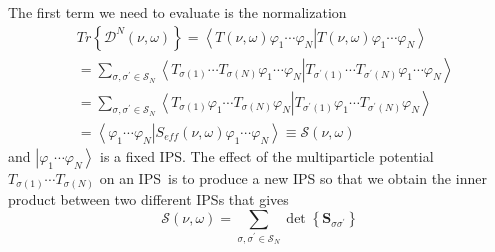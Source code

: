 \documentclass[aps,preprint]{revtex4}%
\begin{document}
The first term we need to evaluate is the normalization
\begin{align}
&  Tr\left\{  \mathcal{D}^{N}\left(  \nu,\omega\right)  \right\}
=\left\langle T\left(  \nu,\omega\right)  \varphi_{1}\cdots\varphi
_{N}\right\vert \left.  T\left(  \nu,\omega\right)  \varphi_{1}\cdots
\varphi_{N}\right\rangle \nonumber\\
&  =\sum_{\sigma,\sigma^{\prime}\in\mathcal{S}_{N}}\left\langle T_{\sigma
\left(  1\right)  }\cdots T_{\sigma\left(  N\right)  }\varphi_{1}\cdots
\varphi_{N}\right.  \left\vert T_{\sigma^{\prime}\left(  1\right)  }\cdots
T_{\sigma^{\prime}\left(  N\right)  }\varphi_{1}\cdots\varphi_{N}\right\rangle
\nonumber\\
&  =\sum_{\sigma,\sigma^{\prime}\in\mathcal{S}_{N}}\left\langle T_{\sigma
\left(  1\right)  }\varphi_{1}\cdots T_{\sigma\left(  N\right)  }\varphi
_{N}\right.  \left\vert T_{\sigma^{\prime}\left(  1\right)  }\varphi_{1}\cdots
T_{\sigma^{\prime}\left(  N\right)  }\varphi_{N}\right\rangle \nonumber\\
&  =\left\langle \varphi_{1}\cdots\varphi_{N}\right\vert \left.
S_{eff}\left(  \nu,\omega\right)  \varphi_{1}\cdots\varphi_{N}\right\rangle
\equiv\mathcal{S}\left(  \nu,\omega\right)
\end{align}
and $\left\vert \varphi_{1}\cdots\varphi_{N}\right\rangle $ is a fixed IPS.
The effect of the multiparticle potential $T_{\sigma\left(  1\right)  }\cdots
T_{\sigma\left(  N\right)  }$ on an IPS\ is to produce a new IPS so that we
obtain the inner product between two different IPSs that gives
\begin{equation}
\mathcal{S}\left(  \nu,\omega\right)  =%
{\textstyle\sum\limits_{\sigma,\sigma^{\prime}\in\mathcal{S}_{N}}}
\det\left\{  \mathbf{S}_{\sigma\sigma^{\prime}}\right\}
\end{equation}
\end{document}
